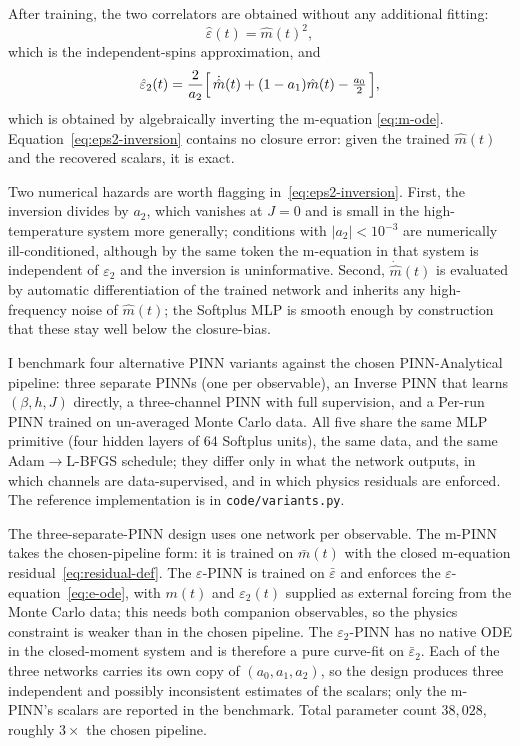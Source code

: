 \documentclass[conference]{IEEEtran}
\newcommand{\mhat}{\hat m(t)}
\newcommand{\mbar}{\bar m(t)}
\newcommand{\eps}{\varepsilon}
\newcommand{\epstwo}{\varepsilon_2}
\begin{document}
After training, the two correlators are obtained without any additional
fitting:
\begin{equation}
  \hat\eps(t) = \mhat^2,
  \label{eq:eps-from-m}
\end{equation}
which is the independent-spins approximation, and
\begin{equation}
  \hat\epstwo(t) = \frac{2}{a_2}\Bigl[\,\dot{\hat m}(t) + (1 - a_1)\hat m(t) - \tfrac{a_0}{2}\,\Bigr],
  \label{eq:eps2-inversion}
\end{equation}
which is obtained by algebraically inverting the m-equation
\eqref{eq:m-ode}. Equation~\eqref{eq:eps2-inversion} contains no closure
error: given the trained $\mhat$ and the recovered scalars, it is exact.

Two numerical hazards are worth flagging in~\eqref{eq:eps2-inversion}.
First, the inversion divides by $a_2$, which vanishes at $J = 0$ and is
small in the high-temperature system more generally; conditions with
$|a_2| < 10^{-3}$ are numerically ill-conditioned, although by the same
token the m-equation in that system is independent of $\epstwo$ and the
inversion is uninformative. Second, $\dot{\hat m}(t)$ is
evaluated by automatic differentiation of the trained network and
inherits any high-frequency noise of $\mhat$; the Softplus MLP is
smooth enough by construction that these stay well below the
closure-bias.

I benchmark four alternative PINN variants against the chosen
PINN-Analytical pipeline: three
separate PINNs (one per observable), an Inverse PINN that learns
$(\beta, h, J)$ directly, a three-channel PINN with full
supervision, and a Per-run PINN trained on un-averaged Monte Carlo
data. All five share the same MLP primitive (four hidden layers of
$64$ Softplus units), the same data, and the same Adam$\to$L-BFGS
schedule; they differ only in what the network outputs, in which
channels are data-supervised, and in which physics residuals are
enforced. The reference implementation is in
\texttt{code/variants.py}.

The three-separate-PINN design uses one network per observable. The
m-PINN takes the chosen-pipeline form: it is trained on $\mbar$ with
the closed m-equation residual~\eqref{eq:residual-def}. The
$\eps$-PINN is trained on $\bar\eps$ and enforces the
$\eps$-equation~\eqref{eq:e-ode}, with $m(t)$ and $\epstwo(t)$
supplied as external forcing from the Monte Carlo data; this needs
both companion observables, so the physics constraint is weaker than
in the chosen pipeline. The $\epstwo$-PINN has no native ODE in the
closed-moment system and is therefore a pure curve-fit on
$\bar\epstwo$. Each of the three networks carries its own copy of
$(a_0, a_1, a_2)$, so the design produces three independent and
possibly inconsistent estimates of the scalars; only the m-PINN's
scalars are reported in the benchmark. Total parameter count $38{,}028$,
roughly $3\times$ the chosen pipeline.
\end{document}

